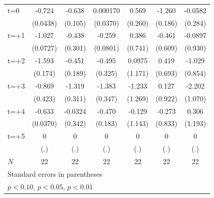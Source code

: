 \begin{table}[htbp]
\begin{tabular}{l*{6}{c}}
\addlinespace
t=0         &      -0.724\sym{***}&      -0.638\sym{**} &    0.000170         &       0.569         &      -1.260\sym{**} &     -0.0582         \\
            &    (0.0438)         &     (0.105)         &    (0.0370)         &     (0.260)         &     (0.186)         &     (0.284)         \\
\addlinespace
t=+1        &      -1.027\sym{***}&      -0.438         &      -0.259\sym{*}  &       0.386         &      -0.461         &     -0.0897         \\
            &    (0.0727)         &     (0.301)         &    (0.0801)         &     (0.741)         &     (0.609)         &     (0.930)         \\
\addlinespace
t=+2        &      -1.593\sym{**} &      -0.451         &      -0.495         &      0.0975         &       0.419         &      -1.029         \\
            &     (0.174)         &     (0.189)         &     (0.325)         &     (1.171)         &     (0.693)         &     (0.854)         \\
\addlinespace
t=+3        &      -0.869         &      -1.319\sym{*}  &      -1.383\sym{*}  &      -1.233         &       0.127         &      -2.202         \\
            &     (0.423)         &     (0.311)         &     (0.347)         &     (1.269)         &     (0.922)         &     (1.070)         \\
\addlinespace
t=+4        &      -0.633\sym{***}&     -0.0324         &      -0.470         &      -0.129         &      -0.273         &       0.306         \\
            &    (0.0370)         &     (0.342)         &     (0.183)         &     (1.143)         &     (0.833)         &     (1.193)         \\
\addlinespace
t=+5        &           0         &           0         &           0         &           0         &           0         &           0         \\
            &         (.)         &         (.)         &         (.)         &         (.)         &         (.)         &         (.)         \\
\midrule
\(N\)       &          22         &          22         &          22         &          22         &          22         &          22         \\
\bottomrule
\multicolumn{7}{l}{\footnotesize Standard errors in parentheses}\\
\multicolumn{7}{l}{\footnotesize \sym{*} \(p<0.10\), \sym{**} \(p<0.05\), \sym{***} \(p<0.01\)}\\
\end{tabular}
\end{table}
